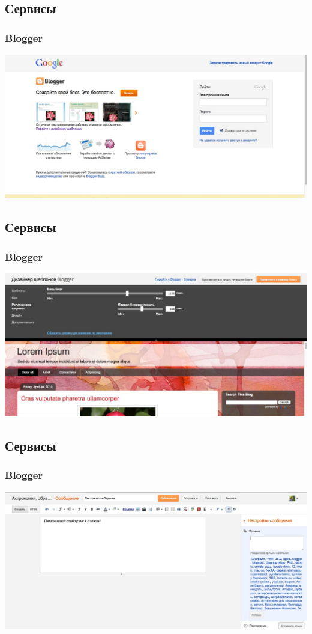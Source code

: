 \documentclass[compress,red]{beamer}
\begin{document}
\subsection{Сервисы}
\begin{frame}
  \frametitle{Blogger}
	\centerline{\includegraphics[width=1.0\textwidth]{images/blogger1.jpg}}
\end{frame}

\subsection{Сервисы}
\begin{frame}
  \frametitle{Blogger}
	\centerline{\includegraphics[width=1.0\textwidth]{images/blogger2.jpg}}
\end{frame}

\subsection{Сервисы}
\begin{frame}
  \frametitle{Blogger}
	\centerline{\includegraphics[width=1.0\textwidth]{images/blogger3.jpg}}
\end{frame}
\end{document}
